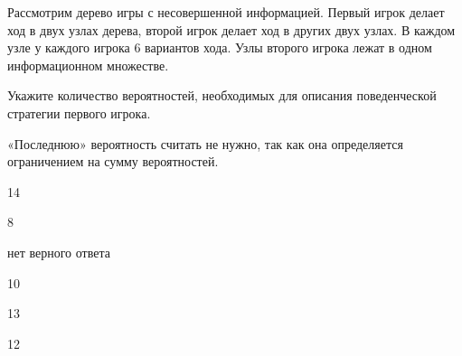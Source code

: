 
\begin{question}
Рассмотрим дерево игры с несовершенной информацией. Первый игрок делает
ход в двух узлах дерева, второй игрок делает ход в других двух узлах. В
каждом узле у каждого игрока 6 вариантов хода. Узлы второго игрока лежат
в одном информационном множестве.

Укажите количество вероятностей, необходимых для описания поведенческой
стратегии первого игрока.

«Последнюю» вероятность считать не нужно, так как она определяется
ограничением на сумму вероятностей.
\begin{answerlist}
  \item 14
  \item 8
  \item нет верного ответа
  \item 10
  \item 13
  \item 12
\end{answerlist}
\end{question}



